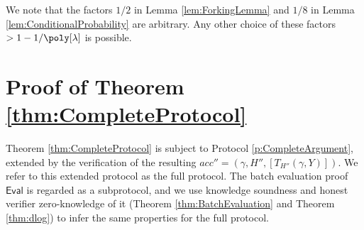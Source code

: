 \documentclass[10pt,article,oneside]{memoir}
\newtheorem{lem}[]{Lemma}
\theoremstyle{definition}
\theoremstyle{remark}
\begin{document}
We note that the factors $1/2$ in Lemma \ref{lem:ForkingLemma} and $1/8$ in Lemma \ref{lem:ConditionalProbability} are arbitrary. 
Any other choice of these factors $>1-1/\poly[\lambda]$ is possible.







\section{Proof of Theorem \ref{thm:CompleteProtocol}}
\label{s:ProofCompleteArgument}

Theorem \ref{thm:CompleteProtocol} is subject to Protocol \ref{p:CompleteArgument}, extended by the verification of the resulting $acc''=(\gamma,H'',[T_{H''}(\gamma,Y)])$. 
We refer to this extended protocol as the full protocol. 
The batch evaluation proof $\mathsf{Eval}$ is regarded as a subprotocol, and we use knowledge soundness and honest verifier zero-knowledge of it (Theorem \ref{thm:BatchEvaluation} and Theorem \ref{thm:dlog}) to infer the same properties for the full protocol.
\end{document}
